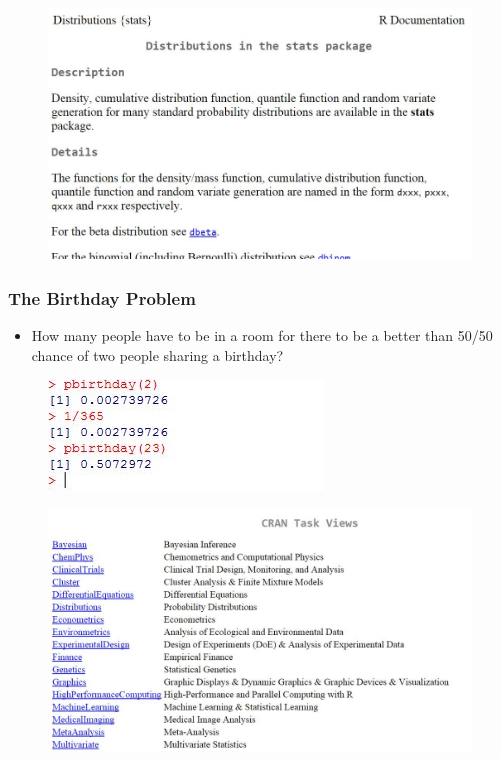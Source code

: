 \documentclass[MAIN.tex]{subfiles}
\begin{document}
\begin{frame}
\begin{figure}
\centering
\includegraphics[width=1.05\linewidth]{images/helpdistributions}
\end{figure}
\end{frame}
\begin{frame}
	\frametitle{The Birthday Problem}
\begin{itemize}
\item How many people have to be in a room for there to be a better than 50/50 chance of two people sharing a birthday?
\end{itemize}	
	\begin{figure}
\centering
\includegraphics[width=0.7\linewidth]{images/pbirthday}
\end{figure}

\end{frame}
\begin{frame}
	\begin{figure}
		\centering
		\includegraphics[width=1.05\linewidth]{images/CRANTaskviewALL}
		
	\end{figure}
\end{frame}
\end{document}
